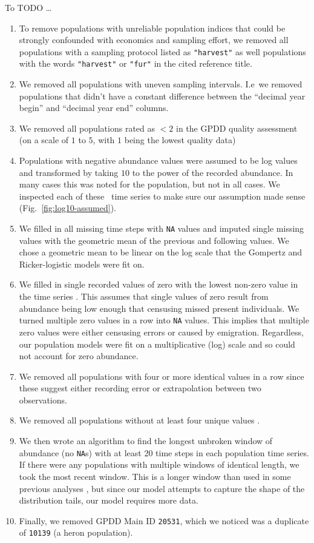 \documentclass[11pt]{article}
\begin{document}
To TODO \ldots

\begin{enumerate}

\item To remove populations with unreliable population indices that could be strongly confounded with economics and sampling effort, we removed all populations with a sampling protocol listed as \texttt{"harvest"} as well populations with the words \texttt{"harvest"} or \texttt{"fur"} in the cited reference title.
\item We removed all populations with uneven sampling intervals. I.e\ we removed populations that didn't have a constant difference between the ``decimal year begin'' and ``decimal year end'' columns.
\item We removed all populations rated as $< 2$ in the GPDD quality assessment (on a scale of $1$ to $5$, with $1$ being the lowest quality data) \citep[following][]{sibly2005, ziebarth2010}
\item Populations with negative abundance values were assumed to be log values and transformed by taking $10$ to the power of the recorded abundance. In many cases this was noted for the population, but not in all cases. We inspected each of these  \totalAssumedLog\ time series to make sure our assumption made sense (Fig.~\ref{fig:log10-assumed}).
\item We filled in all missing time steps with \texttt{NA} values and imputed single missing values with the geometric mean of the previous and following values. We chose a geometric mean to be linear on the log scale that the Gompertz and Ricker-logistic models were fit on.
\item We filled in single recorded values of zero with the lowest non-zero value in the time series \citep[following][]{brook2006a}. This assumes that single values of zero result from abundance being low enough that censusing missed present individuals. We turned multiple zero values in a row into \texttt{NA} values. This implies that multiple zero values were either censusing errors or caused by emigration. Regardless, our population  models were fit on a multiplicative (log) scale and so could not account for zero abundance.
\item We removed all populations with four or more identical values in a row since these suggest either recording error or extrapolation between two observations.
\item We removed all populations without at least four unique values \citep[following][]{brook2006a}.
\item We then wrote an algorithm to find the longest unbroken window of abundance (no \texttt{NA}s) with at least 20 time steps in each population time series.  If there were any populations with multiple windows of identical length, we took the most recent window. This is a longer window than used in some previous analyses \citep[e.g.][]{brook2006a}, but since our model attempts to capture the shape of the distribution tails, our model requires more data.
\item Finally, we removed GPDD Main ID \texttt{20531}, which we noticed was a duplicate of \texttt{10139} (a heron population). 
\end{enumerate}
\end{document}
